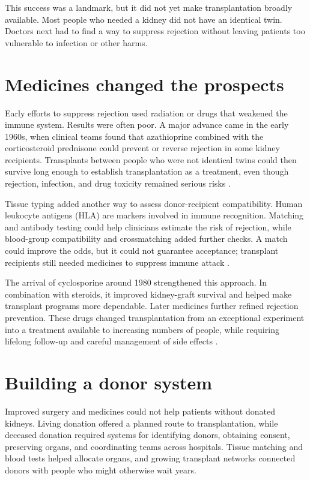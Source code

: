 \documentclass[12pt,oneside]{book}
\begin{document}
This success was a landmark, but it did not yet make transplantation broadly
available. Most people who needed a kidney did not have an identical twin.
Doctors next had to find a way to suppress rejection without leaving patients
too vulnerable to infection or other harms.

\section{Medicines changed the prospects}
Early efforts to suppress rejection used radiation or drugs that weakened
the immune system. Results were often poor. A major advance came in the
early 1960s, when clinical teams found that azathioprine combined with the
corticosteroid prednisone could prevent or reverse rejection in some kidney
recipients. Transplants between people who were not identical twins could
then survive long enough to establish transplantation as a treatment, even
though rejection, infection, and drug toxicity remained serious risks
\cite{renalTransplantDevelopment}.

Tissue typing added another way to assess donor-recipient compatibility.
Human leukocyte antigens (HLA) are markers involved in immune recognition.
Matching and antibody testing could help clinicians estimate the risk of
rejection, while blood-group compatibility and crossmatching added further
checks. A match could improve the odds, but it could not guarantee acceptance;
transplant recipients still needed medicines to suppress immune attack
\cite{organdonorHistory,niddkKidneyTransplant}.

The arrival of cyclosporine around 1980 strengthened this approach. In
combination with steroids, it improved kidney-graft survival and helped make
transplant programs more dependable. Later medicines further refined
rejection prevention. These drugs changed transplantation from an exceptional
experiment into a treatment available to increasing numbers of people, while
requiring lifelong follow-up and careful management of side effects
\cite{renalTransplantDevelopment}.

\section{Building a donor system}
Improved surgery and medicines could not help patients without donated
kidneys. Living donation offered a planned route to transplantation, while
deceased donation required systems for identifying donors, obtaining consent,
preserving organs, and coordinating teams across hospitals. Tissue matching
and blood tests helped allocate organs, and growing transplant networks
connected donors with people who might otherwise wait years.
\end{document}
